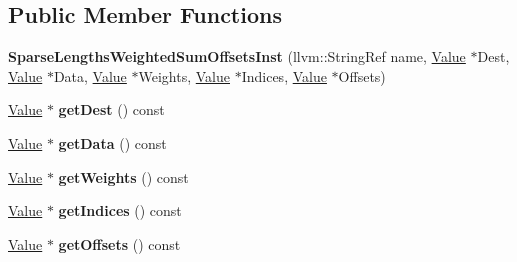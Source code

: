 \subsection*{Public Member Functions}
\begin{DoxyCompactItemize}
\item 
\mbox{\label{classglow_1_1_sparse_lengths_weighted_sum_offsets_inst_a9832ed29a7cf46ef139b3b0c41f0bb0c}} 
{\bfseries Sparse\+Lengths\+Weighted\+Sum\+Offsets\+Inst} (llvm\+::\+String\+Ref name, \hyperlink{classglow_1_1_value}{Value} $\ast$Dest, \hyperlink{classglow_1_1_value}{Value} $\ast$Data, \hyperlink{classglow_1_1_value}{Value} $\ast$Weights, \hyperlink{classglow_1_1_value}{Value} $\ast$Indices, \hyperlink{classglow_1_1_value}{Value} $\ast$Offsets)
\item 
\mbox{\label{classglow_1_1_sparse_lengths_weighted_sum_offsets_inst_acd4c84f0bb9b289e4d2c002f203024f7}} 
\hyperlink{classglow_1_1_value}{Value} $\ast$ {\bfseries get\+Dest} () const
\item 
\mbox{\label{classglow_1_1_sparse_lengths_weighted_sum_offsets_inst_a3c26b5a9f75699cb1473f3d68dcf67aa}} 
\hyperlink{classglow_1_1_value}{Value} $\ast$ {\bfseries get\+Data} () const
\item 
\mbox{\label{classglow_1_1_sparse_lengths_weighted_sum_offsets_inst_a71207b2917dd75c54d4346c018bb2358}} 
\hyperlink{classglow_1_1_value}{Value} $\ast$ {\bfseries get\+Weights} () const
\item 
\mbox{\label{classglow_1_1_sparse_lengths_weighted_sum_offsets_inst_aa2c60be83a7f5591af6536427aecfbd5}} 
\hyperlink{classglow_1_1_value}{Value} $\ast$ {\bfseries get\+Indices} () const
\item 
\mbox{\label{classglow_1_1_sparse_lengths_weighted_sum_offsets_inst_aba63d8de741fce38944a1c683143234b}} 
\hyperlink{classglow_1_1_value}{Value} $\ast$ {\bfseries get\+Offsets} () const
\item 
\mbox{\label{classglow_1_1_sparse_lengths_weighted_sum_offsets_inst_a93b5acc2914a5c23863922de9d197272}} 

\end{DoxyCompactItemize}
